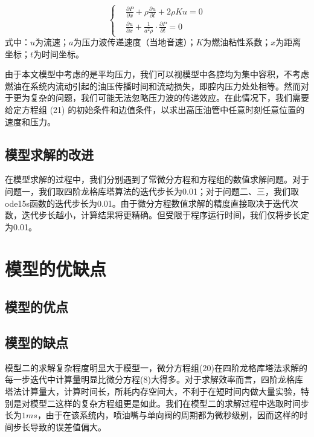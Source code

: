 \documentclass[withoutpreface,bwprint]{cumcmthesis} %
\begin{document}
			\begin{equation}
			\left\{
			\begin{aligned}
			&\frac{\partial P}{\partial x} + \rho \frac{\partial u}{\partial t} + 2 \rho K u = 0 \\
			&\frac{\partial u}{\partial x} + \frac{1}{a^2 \rho} \cdot \frac{\partial P}{\partial t} = 0
			\end{aligned}
			\right.
			\end{equation}
			式中：$u$为流速；$a$为压力波传递速度（当地音速）；$K$为燃油粘性系数；$x$为距离坐标；$t$为时间坐标。
			
			由于本文模型中考虑的是平均压力，我们可以视模型中各腔均为集中容积，不考虑燃油在系统内流动引起的油压传播时间和流动损失，即腔内压力处处相等。然而对于更为复杂的问题，我们可能无法忽略压力波的传递效应。在此情况下，我们需要给定方程组 (21) 的初始条件和边值条件，以求出高压油管中任意时刻任意位置的速度和压力。
			
			\subsection{模型求解的改进}
			
			在模型求解的过程中，我们分别遇到了常微分方程和方程组的数值求解问题。对于问题一，我们取四阶龙格库塔算法的迭代步长为0.01；对于问题二、三，我们取ode15s函数的迭代步长为0.01。由于微分方程数值求解的精度直接取决于迭代次数，迭代步长越小，计算结果将更精确。但受限于程序运行时间，我们仅将步长定为0.01。
			
			\section{模型的优缺点}
			\subsection{模型的优点}
			
			\subsection{模型的缺点}
			模型二的求解复杂程度明显大于模型一，微分方程组(20)在四阶龙格库塔法求解的每一步迭代中计算量明显比微分方程(8)大得多。对于求解效率而言，四阶龙格库塔法计算量大，计算时间长，所耗内存空间大，不利于在短时间内做大量实验，特别是对模型二这样的复杂方程组更是如此。我们在模型二的求解过程中选取时间步长为$1ms$，由于在该系统内，喷油嘴与单向阀的周期都为微秒级别，因而这样的时间步长导致的误差值偏大。
			
\end{document}
